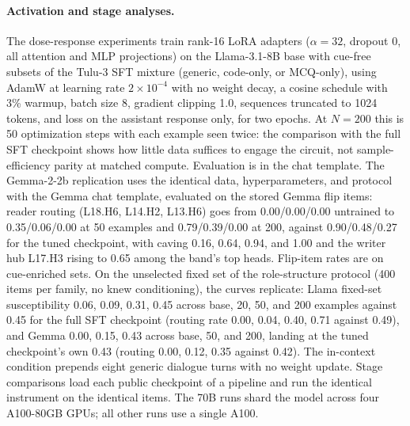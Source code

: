 \documentclass{article}
\begin{document}
\paragraph{Activation and stage analyses.} The dose-response experiments train rank-16 LoRA adapters ($\alpha=32$, dropout 0, all attention and MLP projections) on the Llama-3.1-8B base with cue-free subsets of the Tulu-3 SFT mixture (generic, code-only, or MCQ-only), using AdamW at learning rate $2\times10^{-4}$ with no weight decay, a cosine schedule with 3\% warmup, batch size 8, gradient clipping 1.0, sequences truncated to 1024 tokens, and loss on the assistant response only, for two epochs. At $N=200$ this is 50 optimization steps with each example seen twice: the comparison with the full SFT checkpoint shows how little data suffices to engage the circuit, not sample-efficiency parity at matched compute. Evaluation is in the chat template. The Gemma-2-2b replication uses the identical data, hyperparameters, and protocol with the Gemma chat template, evaluated on the stored Gemma flip items: reader routing (L18.H6, L14.H2, L13.H6) goes from 0.00/0.00/0.00 untrained to 0.35/0.06/0.00 at 50 examples and 0.79/0.39/0.00 at 200, against 0.90/0.48/0.27 for the tuned checkpoint, with caving 0.16, 0.64, 0.94, and 1.00 and the writer hub L17.H3 rising to 0.65 among the band's top heads. Flip-item rates are on cue-enriched sets. On the unselected fixed set of the role-structure protocol (400 items per family, no knew conditioning), the curves replicate: Llama fixed-set susceptibility 0.06, 0.09, 0.31, 0.45 across base, 20, 50, and 200 examples against 0.45 for the full SFT checkpoint (routing rate 0.00, 0.04, 0.40, 0.71 against 0.49), and Gemma 0.00, 0.15, 0.43 across base, 50, and 200, landing at the tuned checkpoint's own 0.43 (routing 0.00, 0.12, 0.35 against 0.42). The in-context condition prepends eight generic dialogue turns with no weight update. Stage comparisons load each public checkpoint of a pipeline and run the identical instrument on the identical items. The 70B runs shard the model across four A100-80GB GPUs; all other runs use a single A100.
\end{document}
